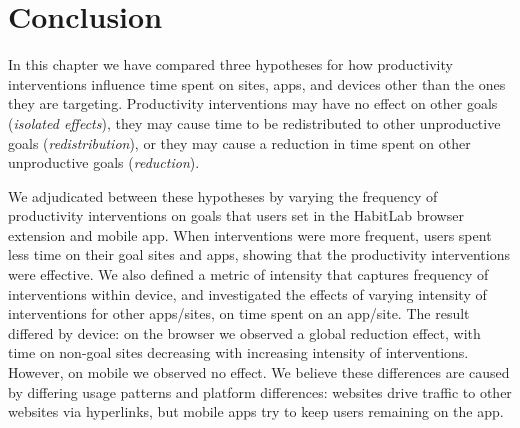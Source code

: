 \section{Conclusion}


In this chapter we have compared three hypotheses for how productivity interventions influence time spent on sites, apps, and devices other than the ones they are targeting. Productivity interventions may have no effect on other goals (\textit{isolated effects}), they may cause time to be redistributed to other unproductive goals (\textit{redistribution}), or they may cause a reduction in time spent on other unproductive goals (\textit{reduction}).

We adjudicated between these hypotheses by varying the frequency of productivity interventions on goals that users set in the HabitLab browser extension and mobile app. When interventions were more frequent, users spent less time on their goal sites and apps, showing that the productivity interventions were effective. We also defined a metric of intensity that captures frequency of interventions within device, and investigated the effects of varying intensity of interventions for other apps/sites, on time spent on an app/site. The result differed by device: on the browser we observed a global reduction effect, with time on non-goal sites decreasing with increasing intensity of interventions. However, on mobile we observed no effect. We believe these differences are caused by differing usage patterns and platform differences: websites drive traffic to other websites via hyperlinks, but mobile apps try to keep users remaining on the app. %



